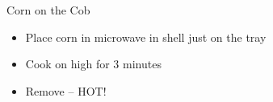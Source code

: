 
\begin{recipe}{Corn on the Cob}%
  \source{}
  \maketitle

  \begin{itemize}[nosep]
  \item Place corn in microwave in shell just on the tray
  \item Cook on high for 3 minutes
  \item Remove -- HOT!
  \end{itemize}
\end{recipe}

